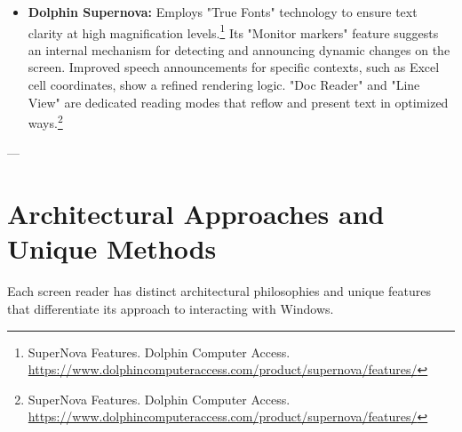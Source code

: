 \begin{itemize}[leftmargin=*,noitemsep,topsep=0pt]
    \item \textbf{Dolphin Supernova:} Employs "True Fonts" technology to ensure text clarity at high magnification levels.\footnote{SuperNova Features. Dolphin Computer Access. \url{https://www.dolphincomputeraccess.com/product/supernova/features/}} Its "Monitor markers" feature suggests an internal mechanism for detecting and announcing dynamic changes on the screen. Improved speech announcements for specific contexts, such as Excel cell coordinates, show a refined rendering logic. "Doc Reader" and "Line View" are dedicated reading modes that reflow and present text in optimized ways.\footnote{SuperNova Features. Dolphin Computer Access. \url{https://www.dolphincomputeraccess.com/product/supernova/features/}}
\end{itemize}

---

\section{Architectural Approaches and Unique Methods}

Each screen reader has distinct architectural philosophies and unique features that differentiate its approach to interacting with Windows.

